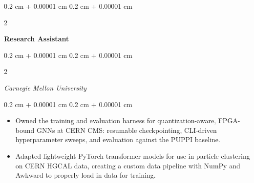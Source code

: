 \documentclass[10pt, letterpaper]{article}
\newenvironment{highlights}{
    \begin{itemize}[
        topsep=0.06 cm,
        parsep=0.06 cm,
        partopsep=0pt,
        itemsep=0pt,
        leftmargin=0.4 cm + 10pt
    ]
}{
    \end{itemize}
} %
\newenvironment{onecolentry}{
    \begin{adjustwidth}{
        0.2 cm + 0.00001 cm
    }{
        0.2 cm + 0.00001 cm
    }
}{
    \end{adjustwidth}
} %
\newenvironment{twocolentry}[2][]{
    \onecolentry
    \def\secondColumn{#2}
    \setcolumnwidth{\fill, 5 cm}
    \begin{paracol}{2}
}{
    \switchcolumn \raggedleft \secondColumn
    \end{paracol}
    \endonecolentry
} %
\begin{document}
        \begin{twocolentry}{
            }
            \textbf{Research Assistant}
        \end{twocolentry}
        \begin{twocolentry}{
            }
            \textit{Carnegie Mellon University}
        \end{twocolentry}
        \vspace{0.06 cm}
        \begin{onecolentry}
            \begin{highlights}
                \item Owned the training and evaluation harness for quantization-aware, FPGA-bound GNNs at CERN CMS: resumable checkpointing, CLI-driven hyperparameter sweeps, and evaluation against the PUPPI baseline.
                \item Adapted lightweight PyTorch transformer models for use in particle clustering on CERN HGCAL data, creating a custom data pipeline with NumPy and Awkward to properly load in data for training.
            \end{highlights}
        \end{onecolentry}

        
\end{document}
